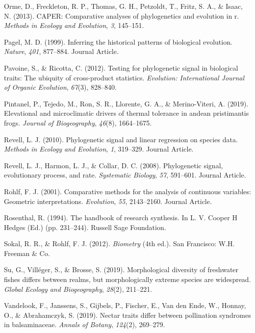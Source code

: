 \documentclass[
]{article}
\newlength{\cslhangindent}
\newenvironment{CSLReferences}[2] %
 {%
  \setlength{\parindent}{0pt}
  \ifodd #1 \everypar{\setlength{\hangindent}{\cslhangindent}}\ignorespaces\fi
  \ifnum #2 > 0
  \setlength{\parskip}{#2\baselineskip}
  \fi
 }%
 {}
\begin{document}
\begin{CSLReferences}{1}{0}
\leavevmode{}%
Orme, D., Freckleton, R. P., Thomas, G. H., Petzoldt, T., Fritz, S. A.,
\& Isaac, N. (2013). CAPER: Comparative analyses of phylogenetics and
evolution in r. \emph{Methods in Ecology and Evolution}, \emph{3},
145--151.

\leavevmode{}%
Pagel, M. D. (1999). Inferring the historical patterns of biological
evolution. \emph{Nature}, \emph{401}, 877--884. Journal Article.

\leavevmode{}%
Pavoine, S., \& Ricotta, C. (2012). Testing for phylogenetic signal in
biological traits: The ubiquity of cross-product statistics.
\emph{Evolution: International Journal of Organic Evolution},
\emph{67}(3), 828--840.

\leavevmode{}%
Pintanel, P., Tejedo, M., Ron, S. R., Llorente, G. A., \& Merino-Viteri,
A. (2019). Elevational and microclimatic drivers of thermal tolerance in
andean pristimantis frogs. \emph{Journal of Biogeography}, \emph{46}(8),
1664--1675.

\leavevmode{}%
Revell, L. J. (2010). Phylogenetic signal and linear regression on
species data. \emph{Methods in Ecology and Evolution}, \emph{1},
319--329. Journal Article.

\leavevmode{}%
Revell, L. J., Harmon, L. J., \& Collar, D. C. (2008). Phylogenetic
signal, evolutionary process, and rate. \emph{Systematic Biology},
\emph{57}, 591--601. Journal Article.

\leavevmode{}%
Rohlf, F. J. (2001). Comparative methods for the analysis of continuous
variables: Geometric interpretations. \emph{Evolution}, \emph{55},
2143--2160. Journal Article.

\leavevmode{}%
Rosenthal, R. (1994). The handbook of research synthesis. In L. V.
Cooper H Hedges (Ed.) (pp. 231--244). Russell Sage Foundation.

\leavevmode{}%
Sokal, R. R., \& Rohlf, F. J. (2012). \emph{Biometry} (4th ed.). San
Francisco: W.H. Freeman \& Co.

\leavevmode{}%
Su, G., Villéger, S., \& Brosse, S. (2019). Morphological diversity of
freshwater fishes differs between realms, but morphologically extreme
species are widespread. \emph{Global Ecology and Biogeography},
\emph{28}(2), 211--221.

\leavevmode{}%
Vandelook, F., Janssens, S., Gijbels, P., Fischer, E., Van den Ende, W.,
Honnay, O., \& Abrahamczyk, S. (2019). Nectar traits differ between
pollination syndromes in balsaminaceae. \emph{Annals of Botany},
\emph{124}(2), 269--279.

\end{CSLReferences}
\end{document}
